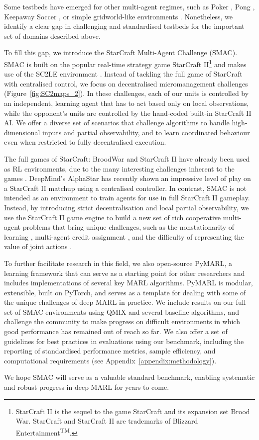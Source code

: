 Some testbeds have emerged for other multi-agent regimes, such as Poker \cite{HeinrichS16}, Pong \cite{tampuu_multiagent_2015}, Keepaway Soccer \cite{stone2005keepaway}, or simple gridworld-like environments \cite{lowe_multi-agent_2017, leibo_multi-agent_2017, yang2018mean, zheng2017magent}.
Nonetheless, we identify a clear gap in challenging and standardised testbeds for the important set of domains described above.

To fill this gap, we introduce the StarCraft Multi-Agent Challenge (SMAC).
SMAC is built on the popular real-time strategy game StarCraft II\footnote{StarCraft II is the sequel to the game StarCraft and its expansion set Brood War. StarCraft and StarCraft II are trademarks of Blizzard Entertainment\textsuperscript{TM}.} and makes use of the SC2LE environment \cite{vinyals_starcraft_2017}.
Instead of tackling the full game of StarCraft with centralised control, we focus on decentralised micromanagement challenges (Figure~\ref{fig:SC2maps_2}).
In these challenges, each of our units is controlled by an independent, learning agent that has to act based only on local observations, while the opponent's units are controlled by the hand-coded built-in StarCraft II AI.
We offer a diverse set of scenarios that challenge algorithms to handle high-dimensional 
inputs and partial observability, and to learn coordinated 
behaviour even when restricted to fully decentralised execution.

The full games of StarCraft: BroodWar and StarCraft II have already been used as RL environments, due to the many interesting challenges inherent to the games \cite{synnaeve_torchcraft:_2016, vinyals_starcraft_2017}. DeepMind's AlphaStar \cite{alphastar} has recently shown an impressive level of play on a StarCraft II matchup using a centralised controller. In contrast, SMAC is not intended as an environment to train agents for use in full StarCraft II gameplay. Instead, by introducing strict decentralisation and local partial observability, we use the StarCraft II game engine to build a new set of rich cooperative multi-agent problems that bring unique challenges, such as the nonstationarity of learning \cite{foerster_stabilising_2017}, multi-agent credit assignment \cite{foerster_counterfactual_2017}, and the difficulty of representing the value of joint actions \cite{rashid_qmix:_2018}.

To further facilitate research in this field, we also open-source PyMARL, a learning framework that can serve as a starting point for other researchers and includes implementations of several key MARL algorithms. PyMARL is modular, extensible, built on PyTorch, and serves as a template for dealing with some of the unique challenges of deep MARL in practice. We include results on our full set of SMAC environments using QMIX \cite{rashid_qmix:_2018} and several baseline algorithms, and challenge the community to make progress on difficult environments in which good performance has remained out of reach so far. 
We also offer a set of guidelines for best practices in evaluations using our benchmark, including the reporting of standardised performance metrics, sample efficiency, and computational requirements (see Appendix~\ref{appendix:methodology}).

We hope SMAC will serve as a valuable standard benchmark, enabling systematic and robust progress in deep MARL for years to come.
